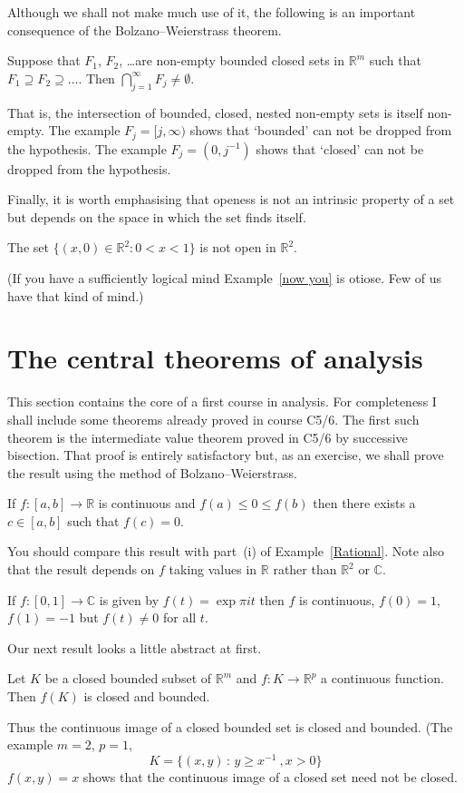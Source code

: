 Although we shall not make much use of it, the following
is an important consequence of the Bolzano--Weierstrass theorem.
\begin{theorem}\label{nested}
Suppose that $F_{1}$, $F_{2}$, \dots are 
non-empty bounded
closed sets in ${\mathbb R}^{m}$ such that 
$F_{1}\supseteq F_{2}\supseteq\dots$. 
Then $\bigcap_{j=1}^{\infty}F_{j}\neq\emptyset.$
\end{theorem}
That is, the intersection of bounded, closed, nested non-empty
sets is itself non-empty.
The example $F_{j}=[j,\infty)$ shows that `bounded'
can not be dropped from the hypothesis. 
The example $F_{j}=(0,j^{-1})$ shows that `closed'
can not be dropped from the hypothesis.

Finally, it is worth emphasising that openess is not an
intrinsic property of a set but depends on the space in which
the set finds itself.
\begin{example}\label{now you}  The set 
$\{(x,0)\in{\mathbb R}^{2}:0<x<1\}$ is not open
in ${\mathbb R}^{2}$.
\end{example}
(If you have a sufficiently logical mind Example~\ref{now you}
is otiose. Few of us have that kind of mind.)
\section{The central theorems of analysis} This section contains the core
of a first course in analysis. For completeness I shall include
some theorems already proved in course C5/6.
The first such theorem is the intermediate value theorem
proved in C5/6 by successive bisection. That proof is
entirely satisfactory but, as an exercise, we shall prove
the result using the method of Bolzano--Weierstrass.
\begin{theorem}  If 
$f:[a,b]\rightarrow{\mathbb R}$ is continuous and
$f(a)\leq 0\leq f(b)$ then there exists a $c\in[a,b]$
such that $f(c)=0$.
\end{theorem}
You should compare this result with part~(i)
of Example~\ref{Rational}. Note also that
the result depends on $f$ taking values in ${\mathbb R}$
rather than ${\mathbb R}^{2}$ or ${\mathbb C}$.
\begin{example} If $f:[0,1]\rightarrow {\mathbb C}$ 
is given by $f(t)=\exp \pi it$ then $f$
is continuous,  $f(0)=1$, $f(1)=-1$ but $f(t)\neq 0$ for
all $t$.
\end{example}

Our next result looks a little abstract at first.
\begin{theorem}\label{compact image}
Let $K$ be a closed bounded subset of
${\mathbb  R}^{m}$ and $f:K\rightarrow {\mathbb  R}^{p}$
a continuous function. Then  $f(K)$ is closed and bounded.
\end{theorem}
Thus the continuous image of a closed bounded set is
closed and bounded. (The example $m=2$, $p=1$,
\[K=\{(x,y)\, : \, y\geq x^{-1}\ ,x>0\}\]
$f(x,y)=x$ shows that the continuous image of a closed
set need not be closed.
 
